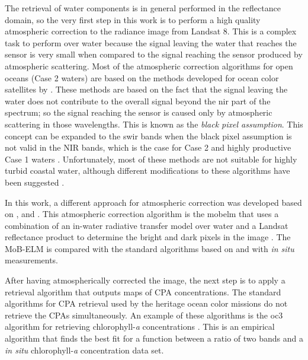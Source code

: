The retrieval of water components is in general performed in the reflectance domain, so the very first step in this work is to perform a high quality atmospheric correction to the radiance image from Landsat 8. This is a complex task to perform over water because the signal leaving the water that reaches the sensor is very small when compared to the signal reaching the sensor produced by atmospheric scattering. Most of the atmospheric correction algorithms for open oceans (Case 2 waters) are based on the methods developed for ocean color satellites by \citet{Gordon:1994}. These methods are based on the fact that the signal leaving the water does not contribute to the overall signal beyond the \acrfull{nir} part of the spectrum; so the signal reaching the sensor is caused only by atmospheric scattering \citep{Gordon:1994} in those wavelengths. This is known as the {\it black pixel assumption}. This concept can be expanded to the \acrfull{swir} bands when the black pixel assumption is not valid in the NIR bands, which is the case for Case 2 and highly productive Case 1 waters \citep{Wang:2007}. Unfortunately, most of these methods are not suitable for highly turbid coastal water, although different modifications to these algorithms have been suggested \citep{Patt2003}.

In this work, a different approach for atmospheric correction was developed based on \citet{Raqueno:2003}, \citet{Gerace:2013} and \citet{Pahlevan:2012}. This atmospheric correction algorithm is the \acrfull{mobelm} that uses a combination of an in-water radiative transfer model over water and a Landsat reflectance product to determine the bright and dark pixels in the image \citep{Concha2014SPIE,Concha2015_SPIE}. The MoB-ELM is compared with the standard algorithms based on \citet{Gordon:1994} and with {\it in situ} measurements.

After having atmospherically corrected the image, the next step is to apply a retrieval algorithm that outputs maps of CPA concentrations. The standard algorithms for CPA retrieval used by the heritage ocean color missions do not retrieve the CPAs simultaneously. An example of these algorithms is the \acrfull{oc3} algorithm for retrieving chlorophyll-{\it a} concentrations \citep{OReilly2000}. This is an empirical algorithm that finds the best fit for a function between a ratio of two bands and a {\it in situ} chlorophyll-{\it a} concentration data set.

